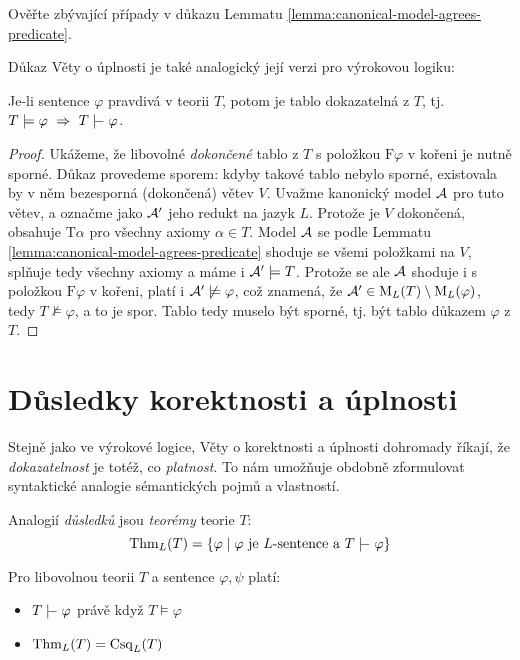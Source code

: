 \begin{exercise}
    Ověřte zbývající případy v důkazu Lemmatu \ref{lemma:canonical-model-agrees-predicate}.
\end{exercise}

Důkaz Věty o úplnosti je také analogický její verzi pro výrokovou logiku:

\begin{theorem}[O úplnosti]\label{theorem:completeness-theorem-predicate}
    Je-li sentence $\varphi$ pravdivá v teorii $T$, potom je tablo dokazatelná z $T$, tj. $T\models\varphi\ \Rightarrow\ T\proves\varphi$.    
\end{theorem} 

\begin{proof}
Ukážeme, že libovolné \emph{dokončené} tablo z $T$ s položkou $\mathrm{F}\varphi$ v kořeni je nutně sporné. Důkaz provedeme sporem: kdyby takové tablo nebylo sporné, existovala by v něm bezesporná (dokončená) větev $V$. Uvažme kanonický model $\mathcal{A}$ pro tuto větev, a označme jako $\mathcal{A}'$ jeho redukt na jazyk $L$. Protože je $V$ dokončená, obsahuje $\mathrm{T}\alpha$ pro všechny axiomy $\alpha\in T$. Model $\mathcal{A}$ se podle Lemmatu \ref{lemma:canonical-model-agrees-predicate} shoduje se všemi položkami na $V$, splňuje tedy všechny axiomy a máme i $\mathcal{A}'\models T$. Protože se ale $\mathcal{A}$ shoduje i s položkou $\mathrm{F}\varphi$ v kořeni, platí i $\mathcal{A}'\not\models\varphi$, což znamená, že $\mathcal{A}'\in \operatorname{M}_L(T)\setminus\operatorname{M}_L(\varphi)$, tedy $T\not\models\varphi$, a to je spor. Tablo tedy muselo být sporné, tj. být tablo důkazem $\varphi$ z $T$.
\end{proof}


\section{Důsledky korektnosti a úplnosti}

Stejně jako ve výrokové logice, Věty o korektnosti a úplnosti dohromady říkají, že \emph{dokazatelnost} je totéž, co \emph{platnost}. To nám umožňuje obdobně zformulovat syntaktické analogie sémantických pojmů a vlastností.

Analogií \emph{důsledků} jsou \emph{teorémy} teorie $T$:
$$
\Thm_L(T)=\{\varphi\mid \varphi\text{ je $L$-sentence a } T\proves\varphi\}
$$

\begin{corollary}[Dokazatelnost = platnost]\label{corollary:corollary-of-soundness-and-completeness-predicate}
    Pro libovolnou teorii $T$ a sentence $\varphi,\psi$ platí:
    \begin{itemize}
        \item $T\proves\varphi$ právě když $T\models\varphi$
        \item $\operatorname{Thm}_L(T)=\operatorname{Csq}_L(T)$
    \end{itemize}
\end{corollary}

